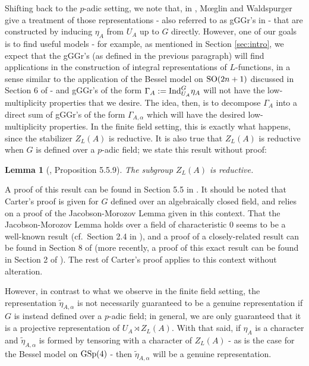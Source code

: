 \documentclass[11pt,letterpaper]{article}
\newcommand{\SO}{\textup{SO}}
\newcommand{\GSp}{\textup{GSp}}
\newcommand{\Ind}{\textup{Ind}}
\newtheorem{Lemma}[Theorem]{Lemma}
\theoremstyle{remark}
\numberwithin{equation}{section}
\begin{document}
Shifting back to the $p$-adic setting, we note that, in \cite{MW}, M\oe glin and Waldspurger give a treatment of those representations - also referred to as gGGr's in \cite{Kaw} - that are constructed by inducing $\eta_A$ from $U_A$ up to $G$ directly. However, one of our goals is to find useful models - for example, as mentioned in Section \ref{sec:intro}, we expect that the gGGr's (as defined in the previous paragraph) will find applications in the construction of integral representations of $L$-functions, in a sense similar to the application of the Bessel model on $\SO(2n+1)$ discussed in Section 6 of \cite{BFF} - and gGGr's of the form $\Gamma_A := \Ind_{U_A}^G \eta_A$ will not have the low-multiplicity properties that we desire. The idea, then, is to decompose $\Gamma_A$ into a direct sum of  gGGr's of the form $\Gamma_{A,\alpha}$ which will have the desired low-multiplicity properties. In the finite field setting, this is exactly what happens, since the stabilizer $Z_L(A)$ is reductive. It is also true that $Z_L(A)$ is reductive when $G$ is defined over a $p$-adic field; we state this result without proof:


\begin{Lemma}[\cite{Car}, Proposition 5.5.9]
The subgroup $Z_L(A)$ is reductive.
\end{Lemma}

A proof of this result can be found in Section 5.5 in \cite{Car}. It should be noted that Carter's proof is given for $G$ defined over an algebraically closed field, and relies on a proof of the Jacobson-Morozov Lemma given in this context. That the Jacobson-Morozov Lemma holds over a field of characteristic 0 seems to be a well-known result (cf.~Section 2.4 in \cite{KL}), and a proof of a closely-related result can be found in Section 8 of \cite{BT} (more recently, a proof of this exact result can be found in Section 2 of \cite{Wit}). The rest of Carter's proof applies to this context without alteration.

However, in contrast to what we observe in the finite field setting, the representation $\widetilde{\eta}_{A,\alpha}$ is not necessarily guaranteed to be a genuine representation if $G$ is instead defined over a $p$-adic field; in general, we are only guaranteed that it is a projective representation of $U_A\rtimes Z_L(A)$. With that said, if $\eta_A$ is a character and $\widetilde{\eta}_{A,\alpha}$ is formed by tensoring with a character of $Z_L(A)$ - as is the case for the Bessel model on $\GSp(4)$ - then $\widetilde{\eta}_{A,\alpha}$ will be a genuine representation.
\end{document}
